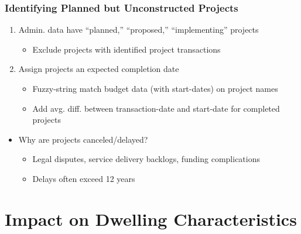 \documentclass[aspectratio=32]{beamer}
\begin{document}


\begin{frame}
\frametitle{Identifying Planned but Unconstructed Projects}

\begin{enumerate}
  \item Admin. data have ``planned,'' ``proposed,'' ``implementing'' projects
    \begin{itemize}
      \item Exclude projects with identified project transactions
    \end{itemize}

    \vspace{.2cm}

  \item Assign projects an expected completion date
    \begin{itemize}
      \item Fuzzy-string match budget data (with start-dates) on project names
      \item Add avg. diff. between transaction-date and start-date for completed projects
    \end{itemize}
\end{enumerate}

\begin{itemize}
  \item Why are projects canceled/delayed? 
    \begin{itemize}
      \item Legal disputes, service delivery backlogs, funding complications
      \item Delays often exceed 12 years 
    \end{itemize} 
\end{itemize}

\end{frame}




\section{Impact on Dwelling Characteristics}
\end{document}

